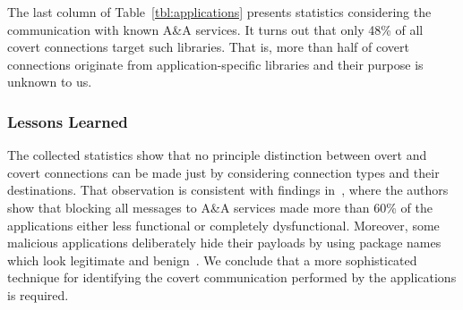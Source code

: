 The last column of Table~\ref{tbl:applications} 
%
presents statistics considering the communication with known A\&A services. 
It turns out that only 48\% of all covert connections target such libraries. 
That is, more than half of covert connections originate from application-specific libraries and their purpose is unknown to us.



\subsubsection{Lessons Learned}
The collected statistics show that no principle distinction between overt and covert connections  
can be made just by considering connection types and their destinations. 
That observation is consistent with findings in~\cite{Hornyack:Han:Jung:Schechter:Wetherall:CCS11}, where the authors 
show that blocking all messages to A\&A services made more than 60\% of the applications either less functional or completely dysfunctional. 
Moreover, some malicious applications deliberately hide their payloads by using package names which look legitimate and benign~\cite{Zhou:Jiang:SP2012}. We conclude that a more sophisticated 
technique for identifying the covert communication performed by the applications is required. 

